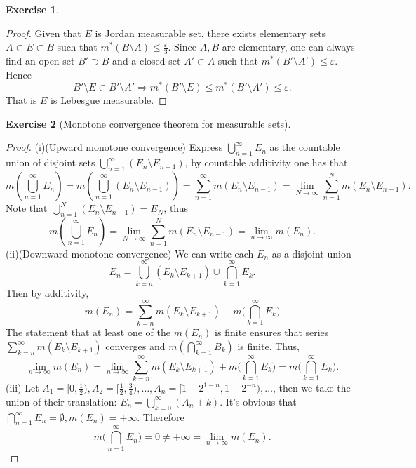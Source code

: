\documentclass[a4paper]{article}
\newtheorem{ex}{Exercise}[subsection]
\begin{document}
\begin{ex}\end{ex}
\begin{proof}
Given that $E$ is Jordan measurable set, there exists elementary sets $A \subset E \subset B$ such that 
$m^*(B \setminus A) \leq \frac{\varepsilon}{3}$. Since $A, B$ are elementary, one can always find an open set $B' \supset B$
and a closed set $A' \subset A$ such that $m^*(B' \setminus A') \leq \varepsilon$. Hence $$
B' \setminus E \subset B' \setminus A' \Rightarrow m^*(B' \setminus E) \leq m^*(B' \setminus A') \leq \varepsilon.
$$That is $E$ is Lebesgue measurable.
\end{proof}

\setcounter{ex}{10}
\begin{ex}[Monotone convergence theorem for measurable sets]\end{ex}
\begin{proof}
(i)(Upward monotone convergence) Express $\bigcup_{n = 1}^\infty E_n$ as the countable union of disjoint sets 
$\bigcup_{n = 1}^\infty (E_n \setminus E_{n - 1})$, by countable additivity one has that $$
m\left( \bigcup_{n = 1}^\infty E_n \right) = m\left( \bigcup_{n = 1}^\infty (E_n \setminus E_{n - 1}) \right)
= \sum_{n = 1}^\infty m(E_n \setminus E_{n - 1}) = \lim_{N \to \infty} \sum_{n = 1}^N m(E_n \setminus E_{n - 1}).
$$Note that $\bigcup_{n = 1}^N (E_n \setminus E_{n - 1}) = E_N$, thus $$
m\left( \bigcup_{n = 1}^\infty E_n \right) = \lim_{N \to \infty} \sum_{n = 1}^N m(E_n \setminus E_{n - 1})
= \lim_{n \to \infty} m(E_n).
$$
(ii)(Downward monotone convergence) We can write each $E_n$ as a disjoint union $$
E_n = \bigcup_{k = n}^\infty (E_k \setminus E_{k + 1}) \cup \bigcap_{k = 1}^\infty E_k.
$$Then by additivity,$$
m(E_n) = \sum_{k = n}^\infty m(E_k \setminus E_{k + 1}) + m\Big(\bigcap_{k = 1}^\infty E_k \Big)
$$The statement that at least one of the $m(E_n)$ is finite ensures that series $\sum_{k = n}^\infty m(E_k \setminus E_{k + 1})$ converges
and $m(\bigcap_{k = 1}^\infty B_k)$ is finite. Thus,$$
\lim_{n \to \infty} m(E_n) = \lim_{n \to \infty} \sum_{k = n}^\infty m(E_k \setminus E_{k + 1}) + 
m\Big(\bigcap_{k = 1}^\infty E_k \Big) = m\Big(\bigcap_{k = 1}^\infty E_k \Big).
$$
(iii) Let $A_1 = [0, \frac{1}{2}), A_2 = [\frac{1}{2}, \frac{3}{4}), \dots, A_n = [1 - 2^{1 - n}, 1 - 2^{-n}), \dots$,
then we take the union of their translation: $E_n = \bigcup_{k = 0}^\infty (A_n + k)$. It's obvious that 
$\bigcap_{n = 1}^\infty E_n = \emptyset, m(E_n) = +\infty$. Therefore$$
m\Big(\bigcap_{n = 1}^\infty E_n\Big) = 0 \ne +\infty = \lim_{n \to \infty} m(E_n).
$$
\end{proof}
\end{document}
